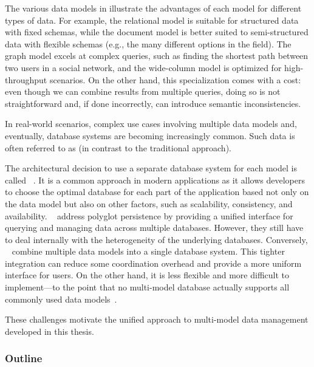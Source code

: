 The various data models in  illustrate the advantages of each model for different types of data. For example, the relational model is suitable for structured data with fixed schemas, while the document model is better suited to semi-structured data with flexible schemas (e.g., the many different options in the  field). The graph model excels at complex queries, such as finding the shortest path between two users in a social network, and the wide-column model is optimized for high-throughput scenarios. On the other hand, this specialization comes with a cost: even though we can combine results from multiple queries, doing so is not straightforward and, if done incorrectly, can introduce semantic inconsistencies.

In real-world scenarios, complex use cases involving multiple data models and, eventually, database systems are becoming increasingly common. Such data is often referred to as  (in contrast to the traditional  approach).

The architectural decision to use a separate database system for each model is called ~\citep{PolyglotPersistance}. It is a common approach in modern applications as it allows developers to choose the optimal database for each part of the application based not only on the data model but also on other factors, such as scalability, consistency, and availability. ~\citep{9252014} address %
polyglot persistence by providing a unified interface for querying and managing data across multiple databases. However, they still have to deal internally with the heterogeneity of the underlying databases. Conversely, ~\citep{CSUR-Jiaheng} combine multiple data models into a single database system. This tighter integration can reduce some coordination overhead and provide a more uniform interface for users. On the other hand, it is less flexible and more difficult to implement---to the point that no multi-model database actually supports all commonly used data models~\citep{DBEngines2026}.

These challenges motivate the unified approach to multi-model data management developed in this thesis.

\subsubsection{Outline}

